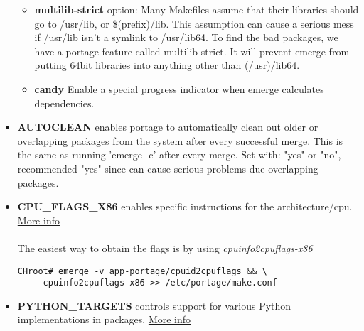 \documentclass[10pt,a4paper]{article}
\begin{document}
\begin{itemize}
\begin{itemize}[label={o}]
                        \item \textbf{multilib-strict} option: Many Makefiles assume that their libraries should go to /usr/lib, or \$(prefix)/lib. This assumption can cause a serious mess if /usr/lib isn't a symlink to /usr/lib64. To find the bad packages, we have a portage feature called multilib-strict. It will prevent emerge from putting 64bit libraries into anything other than (/usr)/lib64.
                        
                        \item \textbf{candy} Enable a special progress indicator when emerge calculates dependencies.
                        
                    \end{itemize}
                
                    \item \textbf{AUTOCLEAN} enables portage to automatically clean out older or overlapping packages from the system after every successful merge. This is the same as running 'emerge -c' after every merge. Set with: "yes" or "no", recommended "yes" since can cause serious problems due overlapping packages.
                    

                    
                    \item \textbf{CPU\_FLAGS\_X86} enables specific instructions for the architecture/cpu. \href{https://wiki.gentoo.org/wiki/CPU_FLAGS_X86}{More info}
                    

    
                        \paragraph{} The easiest way to obtain the flags is by using \textit{cpuinfo2cpuflags-x86}
         
\begin{lstlisting}[style=BashInputCHRoot]
 CHroot# emerge -v app-portage/cpuid2cpuflags && \
     cpuinfo2cpuflags-x86 >> /etc/portage/make.conf
\end{lstlisting}
                    
                    \item \textbf{PYTHON\_TARGETS} controls support for various Python implementations in packages. \href{https://wiki.gentoo.org/wiki/Project:Python/PYTHON_TARGETS}{More info}
                    

\end{itemize}
\end{document}
